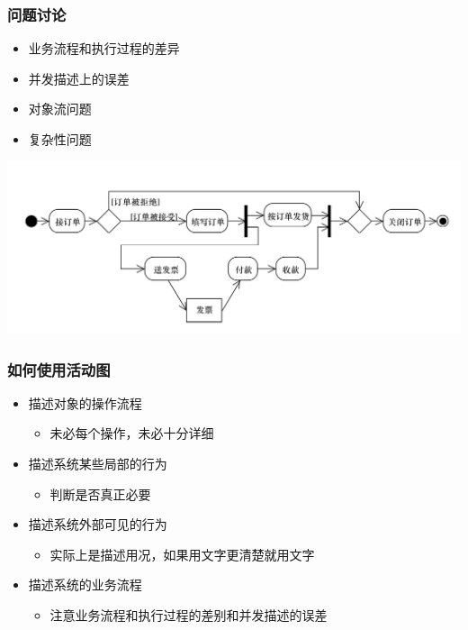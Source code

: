 \documentclass[compress]{beamer}
\begin{document}
\begin{frame}
  \frametitle{问题讨论}
  \begin{itemize}
    \item 业务流程和执行过程的差异
    \item 并发描述上的误差 
    \item 对象流问题 
    \item 复杂性问题
  \end{itemize}
  \begin{center}
    \centering\includegraphics[width=1.0\hsize]{case1.pdf}
  \end{center}
\end{frame}

\begin{frame}
  \frametitle{如何使用活动图}
  \begin{itemize}
    \item 描述对象的操作流程
      \begin{itemize}
        \item 未必每个操作，未必十分详细
      \end{itemize}
    \item 描述系统某些局部的行为
      \begin{itemize}
        \item 判断是否真正必要
      \end{itemize}
    \item 描述系统外部可见的行为
      \begin{itemize}
        \item 实际上是描述用况，如果用文字更清楚就用文字
      \end{itemize}
    \item 描述系统的业务流程 
      \begin{itemize}
        \item 注意业务流程和执行过程的差别和并发描述的误差
      \end{itemize}
  \end{itemize}
\end{frame}
\end{document}
